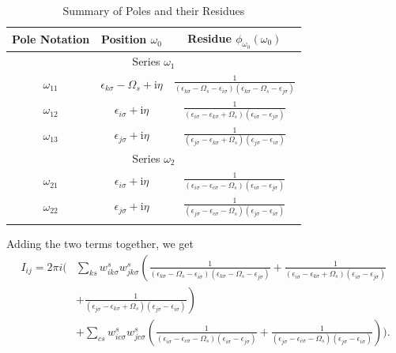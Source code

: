 \documentclass[12pt]{caltech_thesis}
\begin{document}
\begin{table}[h]
\centering
\caption{Summary of Poles and their Residues}
\begin{tabular}{|c|c|c|}
\hline
Pole Notation & Position $\omega_0$ & Residue $\phi_{\omega_0}(\omega_0)$ \\
\hline
\multicolumn{3}{|c|}{Series $\omega_1$} \\
\hline
$\omega_{11}$ & $\epsilon_{k \sigma} - \Omega_s + \mathrm{i} \eta$ & $\frac{1}{(\epsilon_{k \sigma} - \Omega_s -\epsilon_{i \sigma})(\epsilon_{k \sigma} - \Omega_s -\epsilon_{j \sigma})}$ \\
$\omega_{12}$ & $\epsilon_{i \sigma} + \mathrm{i} \eta$ & $\frac{1}{(\epsilon_{i \sigma} -\epsilon_{k \sigma}+\Omega_s)(\epsilon_{i \sigma} -\epsilon_{j \sigma})}$ \\
$\omega_{13}$ & $\epsilon_{j \sigma} + \mathrm{i} \eta$ & $\frac{1}{(\epsilon_{j \sigma} -\epsilon_{k \sigma}+\Omega_s)(\epsilon_{j \sigma} -\epsilon_{i \sigma})}$ \\
\hline
\multicolumn{3}{|c|}{Series $\omega_2$} \\
\hline
$\omega_{21}$ & $\epsilon_{i \sigma} + \mathrm{i} \eta$ & $\frac{1}{(\epsilon_{i \sigma} -\epsilon_{c \sigma}-\Omega_s)(\epsilon_{i \sigma} -\epsilon_{j \sigma})}$ \\
$\omega_{22}$ & $\epsilon_{j \sigma} + \mathrm{i} \eta$ & $\frac{1}{(\epsilon_{j \sigma} -\epsilon_{c \sigma}-\Omega_s)(\epsilon_{j \sigma} -\epsilon_{i \sigma})}$ \\
\hline
\label{tabpoles_residues_occupied}
\end{tabular}
\end{table}
Adding the two terms together, we get
\begin{equation}
\begin{aligned}
I_{ij} = 2\pi i \Bigg( & \sum_{ks} w_{i k \sigma}^s w_{j k \sigma}^s \left( \frac{1}{(\epsilon_{k \sigma} - \Omega_s - \epsilon_{i \sigma})(\epsilon_{k \sigma} - \Omega_s - \epsilon_{j \sigma})} + \frac{1}{(\epsilon_{i \sigma} - \epsilon_{k \sigma} + \Omega_s)(\epsilon_{i \sigma} - \epsilon_{j \sigma})} \right. \\
& \left. + \frac{1}{(\epsilon_{j \sigma} - \epsilon_{k \sigma} + \Omega_s)(\epsilon_{j \sigma} - \epsilon_{i \sigma})} \right) \\
& + \sum_{cs} w_{i c \sigma}^s w_{j c \sigma}^s \left( \frac{1}{(\epsilon_{i \sigma} - \epsilon_{c \sigma} - \Omega_s)(\epsilon_{i \sigma} - \epsilon_{j \sigma})} + \frac{1}{(\epsilon_{j \sigma} - \epsilon_{c \sigma} - \Omega_s)(\epsilon_{j \sigma} - \epsilon_{i \sigma})} \right) \Bigg).
\end{aligned}
\end{equation}
\end{document}
